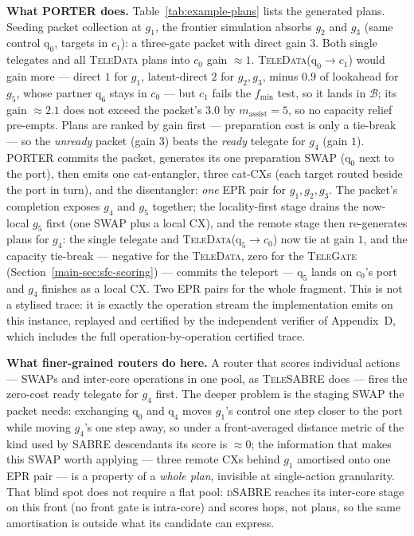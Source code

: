 \documentclass[journal]{IEEEtran}
\newcommand{\PORTER}{\textsc{PORTER}}
\newcommand{\TeleSABRE}{\textsc{TeleSABRE}}
\newcommand{\dSABRE}{\textsc{dSABRE}}
\newcommand{\SABRE}{\textsc{SABRE}}
\newcommand{\TeleData}{\textsc{TeleData}}
\newcommand{\TeleGate}{\textsc{TeleGate}}
\newcommand{\logi}[1]{\mathrm{q}_{#1}}
\begin{document}
\textbf{What \PORTER{} does.} Table~\ref{tab:example-plans} lists the
generated plans. Seeding packet collection at $g_1$, the frontier
simulation absorbs $g_2$ and $g_3$ (same control $\logi{0}$, targets
in $c_1$): a three-gate packet with direct gain $3$. Both single
telegates and all \TeleData{} plans into $c_0$ gain ${\approx}1$.
\TeleData{}($\logi{0}\!\to\!c_1$) would gain more --- direct $1$ for
$g_1$, latent-direct $2$ for $g_2,g_3$, minus $0.9$ of lookahead for
$g_5$, whose partner $\logi{6}$ stays in $c_0$ --- but $c_1$ fails the
$f_\mathrm{min}$ test, so it lands in $\mathcal{B}$; its gain
${\approx}2.1$ does not exceed the packet's $3.0$ by
$m_\mathrm{assist}{=}5$, so no capacity relief pre-empts. Plans are
ranked by gain first --- preparation cost is only a tie-break --- so
the \emph{unready} packet (gain $3$) beats the \emph{ready} telegate for
$g_4$ (gain $1$). \PORTER{} commits the packet, generates its one
preparation SWAP ($\logi{0}$ next to the port), then emits one
cat-entangler, three cat-CXs (each target routed beside the port in
turn), and the disentangler: \emph{one} EPR pair for $g_1,g_2,g_3$.
The packet's completion exposes $g_4$ and $g_5$ together; the
locality-first stage drains the now-local $g_5$ first (one SWAP plus
a local CX), and the remote stage then re-generates plans for $g_4$:
the single telegate and \TeleData{}($\logi{5}\!\to\!c_0$) now tie at
gain $1$, and the capacity tie-break --- negative for the \TeleData{},
zero for the \TeleGate{} (Section~\ref{main-sec:sfc-scoring}) --- commits
the teleport ---
$\logi{5}$ lands on $c_0$'s port and $g_4$ finishes as a local CX.
Two EPR pairs for the whole fragment. This is not a stylised
trace: it is exactly the operation stream the implementation emits
on this instance, replayed and certified by the independent verifier
of Appendix~D, which includes the full
operation-by-operation certified trace.

\textbf{What finer-grained routers do here.} A router that scores
individual actions --- SWAPs and inter-core operations in one pool, as
\TeleSABRE{} does --- fires the zero-cost ready telegate for $g_4$
first. The deeper problem is the staging SWAP the packet needs:
exchanging $\logi{0}$ and $\logi{4}$ moves $g_1$'s control one step
closer to the port while moving $g_4$'s one step away, so under a
front-averaged distance metric of the kind used by \SABRE{} descendants
its score is ${\approx}0$; the information that makes this SWAP worth
applying --- three remote CXs behind $g_1$ amortised onto one EPR pair
--- is a property of a \emph{whole plan}, invisible at single-action
granularity. That blind spot does not require a flat pool: \dSABRE{}
reaches its inter-core stage on this front (no front gate is
intra-core) and scores hops, not plans, so the same amortisation is
outside what its candidate can express.
\end{document}
